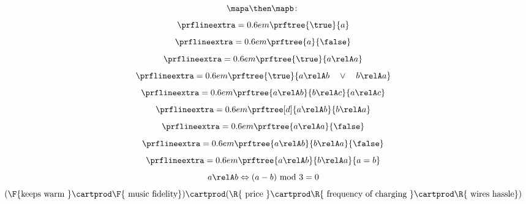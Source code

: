 {\begin{forslides}
\begin{equation*}
            \mapa \then \mapb \colon
        \end{equation*}
        \begin{equation*}
            \label{eq:top1}
            \prflineextra=0.6em
            \prftree{\true}{a}
        \end{equation*}
        \begin{equation*}
            \label{eq:bot1}
            \prflineextra=0.6em
            \prftree{a}{\false}
        \end{equation*}
        \begin{equation*}
            \label{eq:rel_refl}
            \prflineextra=0.6em
            \prftree{\true}{a\relA a}
        \end{equation*}
        \begin{equation*}
            \label{eq:rel_tot}
            \prflineextra=0.6em
            \prftree{\true}{a\relA b \quad \vee \quad b\relA a}
        \end{equation*}
        \begin{equation*}
            \label{eq:rel_tran}
            \prflineextra=0.6em
            \prftree{a\relA b}{b\relA c}{a\relA c}
        \end{equation*}
        \begin{equation*}
            \label{eq:rel_sym}
            \prflineextra=0.6em
            \prftree[d]{a \relA b}{b\relA a}
        \end{equation*}
        \begin{equation*}
            \label{eq:rel_irr}
            \prflineextra=0.6em
            \prftree{a \relA a}{\false}
        \end{equation*}
        \begin{equation*}
            \label{eq:rel_asy}
            \prflineextra=0.6em
            \prftree{a \relA b}{b\relA a}{\false}
        \end{equation*}
        \begin{equation*}
            \label{eq:rel_antisy}
            \prflineextra=0.6em
            \prftree{a \relA b}{b\relA a}{a=b}
        \end{equation*}
        \begin{equation*}
            \label{eq:ex}
            a\relA b \Leftrightarrow (a-b) \text{ mod }3=0
        \end{equation*}
        \begin{equation*}
            \label{eq:fun_cost}
            (\F{\text{keeps warm }}\cartprod \F{\text{ music fidelity}})\cartprod(\R{\text{ price }} \cartprod \R{\text{ frequency of charging }}\cartprod \R{\text{ wires hassle}})

\end{equation*}
\end{forslides}}

